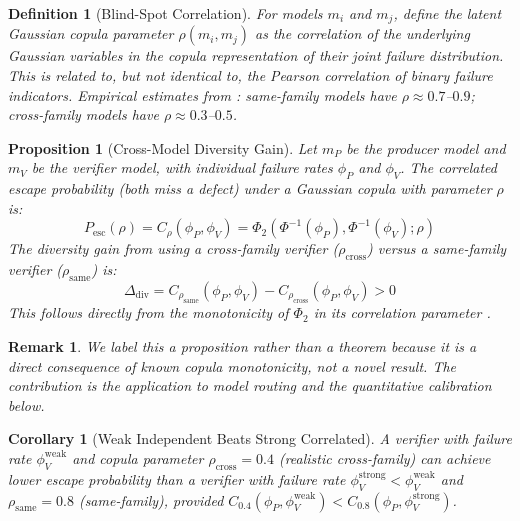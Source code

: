 \documentclass[11pt, a4paper, copyright]{googledeepmind}
\newtheorem{definition}{Definition}[section]
\newtheorem{proposition}{Proposition}[section]
\newtheorem{corollary}{Corollary}[section]
\newtheorem*{remark}{Remark}
\begin{document}
\begin{definition}[Blind-Spot Correlation]
For models $m_i$ and $m_j$, define the latent Gaussian copula parameter $\rho(m_i, m_j)$ as the correlation of the underlying Gaussian variables in the copula representation of their joint failure distribution. This is related to, but not identical to, the Pearson correlation of binary failure indicators. Empirical estimates from \citet{correlatedensemble2026}: same-family models have $\rho \approx 0.7$--$0.9$; cross-family models have $\rho \approx 0.3$--$0.5$.
\end{definition}

\begin{proposition}[Cross-Model Diversity Gain]
\label{prop:diversity}
Let $m_P$ be the producer model and $m_V$ be the verifier model, with individual failure rates $\phi_P$ and $\phi_V$. The correlated escape probability (both miss a defect) under a Gaussian copula \citep{sklar1959} with parameter $\rho$ is:
\begin{equation}
P_{\mathrm{esc}}(\rho) = C_\rho(\phi_P, \phi_V) = \Phi_2(\Phi^{-1}(\phi_P), \Phi^{-1}(\phi_V); \rho)
\end{equation}
The diversity gain from using a cross-family verifier ($\rho_{\mathrm{cross}}$) versus a same-family verifier ($\rho_{\mathrm{same}}$) is:
\begin{equation}
\Delta_{\mathrm{div}} = C_{\rho_{\mathrm{same}}}(\phi_P, \phi_V) - C_{\rho_{\mathrm{cross}}}(\phi_P, \phi_V) > 0
\end{equation}
This follows directly from the monotonicity of $\Phi_2$ in its correlation parameter \citep{nelsen2006copulas}.
\end{proposition}

\begin{remark}
We label this a proposition rather than a theorem because it is a direct consequence of known copula monotonicity, not a novel result. The contribution is the application to model routing and the quantitative calibration below.
\end{remark}

\begin{corollary}[Weak Independent Beats Strong Correlated]
\label{cor:weakbeats}
A verifier with failure rate $\phi_V^{\mathrm{weak}}$ and copula parameter $\rho_{\mathrm{cross}} = 0.4$ (realistic cross-family) can achieve lower escape probability than a verifier with failure rate $\phi_V^{\mathrm{strong}} < \phi_V^{\mathrm{weak}}$ and $\rho_{\mathrm{same}} = 0.8$ (same-family), provided $C_{0.4}(\phi_P, \phi_V^{\mathrm{weak}}) < C_{0.8}(\phi_P, \phi_V^{\mathrm{strong}})$.
\end{corollary}
\end{document}
